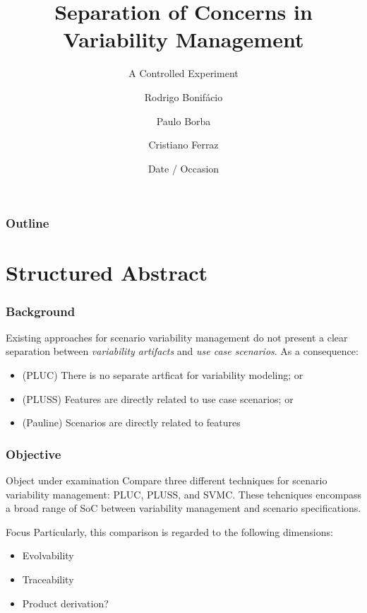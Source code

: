 \documentclass{beamer}
\title{Separation of Concerns in Variability Management}
\subtitle{A Controlled Experiment}
\author{Rodrigo Bonif\'{a}cio\inst{1} \and Paulo Borba\inst{1} \and Cristiano
Ferraz\inst{2}}
\institute[Federal University of Pernambuco]
{
\inst{1}%
Informatics Center
\and
\inst{2}%
Department of Statistics}
\date{Date / Occasion}
\begin{document}
\begin{frame}
\titlepage
\end{frame}

\begin{frame}
\frametitle{Outline}
\tableofcontents
\end{frame}


\section{Structured Abstract}

\begin{frame}
\frametitle{Background}
Existing approaches for scenario variability management do not present a clear
separation between \emph{variability artifacts} and \emph{use case scenarios}.
As a consequence:
\begin{itemize}
  \item (PLUC) There is no separate artficat for variability modeling; or
  \item (PLUSS) Features are directly related to use case scenarios; or 
  \item (Pauline) Scenarios are directly related to features
\end{itemize}
\end{frame}

\begin{frame}
\frametitle{Objective}

\begin{block}{Object under examination}
Compare three different techniques for scenario variability management: PLUC,
PLUSS, and SVMC. These tehcniques encompass a broad range of SoC between
variability management and scenario specifications.
\end{block}

\begin{block}{Focus}
Particularly, this comparison is regarded to the following dimensions:
\begin{itemize}
  \item Evolvability 
  \item Traceability
  \item Product derivation?
\end{itemize}

\end{block}
  
\end{frame}
\end{document}
